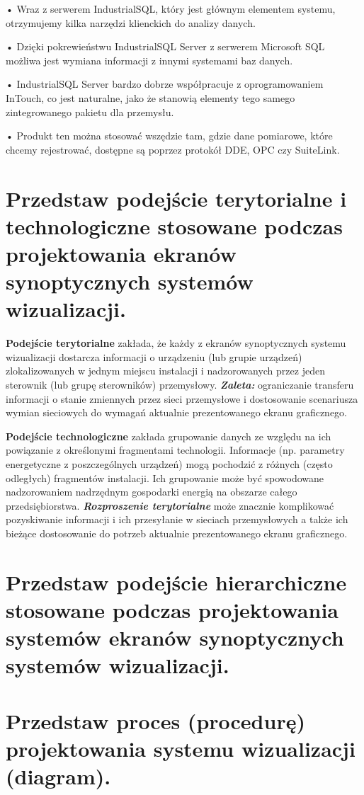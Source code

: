 \documentclass{article}
\begin{document}
	• Wraz z serwerem IndustrialSQL, który jest głównym elementem
	systemu, otrzymujemy kilka narzędzi klienckich do analizy danych.
	
	• Dzięki pokrewieństwu IndustrialSQL Server z serwerem Microsoft SQL
	możliwa jest wymiana informacji z innymi systemami baz danych.
	
	• IndustrialSQL Server bardzo dobrze współpracuje z oprogramowaniem
	InTouch, co jest naturalne, jako że stanowią elementy tego samego
	zintegrowanego pakietu dla przemysłu.
	
	• Produkt ten można stosować wszędzie tam, gdzie dane pomiarowe,
	które chcemy rejestrować, dostępne są poprzez protokół DDE, OPC czy
	SuiteLink.
	
	\section{Przedstaw podejście terytorialne i technologiczne stosowane podczas projektowania	ekranów synoptycznych systemów wizualizacji.}
\textbf{	Podejście terytorialne} zakłada, że każdy z ekranów
	synoptycznych systemu wizualizacji dostarcza informacji o
	urządzeniu (lub grupie urządzeń) zlokalizowanych w jednym miejscu
	instalacji i nadzorowanych przez jeden sterownik (lub grupę
	sterowników) przemysłowy.
	\textit{\textbf{Zaleta:}} ograniczanie transferu informacji o stanie zmiennych przez
	sieci przemysłowe i dostosowanie scenariusza wymian sieciowych do
	wymagań aktualnie prezentowanego ekranu graficznego.
	
	
	\textbf{Podejście technologiczne }zakłada grupowanie danych ze względu na
	ich powiązanie z określonymi fragmentami technologii. Informacje (np.
	parametry energetyczne z poszczególnych urządzeń) mogą pochodzić z
	różnych (często odległych) fragmentów instalacji. Ich grupowanie może być
	spowodowane nadzorowaniem nadrzędnym gospodarki energią na obszarze
	całego przedsiębiorstwa.
	\textbf{\textit{Rozproszenie terytorialne }}może znacznie komplikować pozyskiwanie
	informacji i ich przesyłanie w sieciach przemysłowych a także ich bieżące
	dostosowanie do potrzeb aktualnie prezentowanego ekranu graficznego.
	
	\section{Przedstaw podejście hierarchiczne stosowane podczas projektowania systemów	ekranów synoptycznych systemów wizualizacji.}
	
	
	\section{Przedstaw proces (procedurę) projektowania systemu wizualizacji (diagram).}
\end{document}
